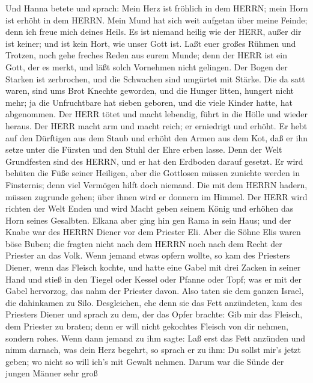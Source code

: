 Und Hanna betete und sprach: Mein Herz ist fröhlich in dem
HERRN; mein Horn ist erhöht in dem HERRN. Mein Mund hat sich weit
aufgetan über meine Feinde; denn ich freue mich deines Heils.
 Es ist niemand heilig wie der HERR, außer dir ist keiner;
und ist kein Hort, wie unser Gott ist.  Laßt euer großes
Rühmen und Trotzen, noch gehe freches Reden aus eurem Munde; denn der
HERR ist ein Gott, der es merkt, und läßt solch Vornehmen nicht
gelingen.  Der Bogen der Starken ist zerbrochen, und die
Schwachen sind umgürtet mit Stärke.  Die da satt waren, sind
ums Brot Knechte geworden, und die Hunger litten, hungert nicht mehr; ja
die Unfruchtbare hat sieben geboren, und die viele Kinder hatte, hat
abgenommen.  Der HERR tötet und macht lebendig, führt in die
Hölle und wieder heraus.  Der HERR macht arm und macht
reich; er erniedrigt und erhöht.  Er hebt auf den Dürftigen
aus dem Staub und erhöht den Armen aus dem Kot, daß er ihn setze unter
die Fürsten und den Stuhl der Ehre erben lasse. Denn der Welt
Grundfesten sind des HERRN, und er hat den Erdboden darauf gesetzt.
 Er wird behüten die Füße seiner Heiligen, aber die
Gottlosen müssen zunichte werden in Finsternis; denn viel Vermögen hilft
doch niemand.  Die mit dem HERRN hadern, müssen zugrunde
gehen; über ihnen wird er donnern im Himmel. Der HERR wird richten der
Welt Enden und wird Macht geben seinem König und erhöhen das Horn seines
Gesalbten.  Elkana aber ging hin gen Rama in sein Haus; und
der Knabe war des HERRN Diener vor dem Priester Eli.  Aber
die Söhne Elis waren böse Buben; die fragten nicht nach dem HERRN
 noch nach dem Recht der Priester an das Volk. Wenn jemand
etwas opfern wollte, so kam des Priesters Diener, wenn das Fleisch
kochte, und hatte eine Gabel mit drei Zacken in seiner Hand
 und stieß in den Tiegel oder Kessel oder Pfanne oder Topf;
was er mit der Gabel hervorzog, das nahm der Priester davon. Also taten
sie dem ganzen Israel, die dahinkamen zu Silo. 
Desgleichen, ehe denn sie das Fett anzündeten, kam des Priesters Diener
und sprach zu dem, der das Opfer brachte: Gib mir das Fleisch, dem
Priester zu braten; denn er will nicht gekochtes Fleisch von dir nehmen,
sondern rohes.  Wenn dann jemand zu ihm sagte: Laß erst das
Fett anzünden und nimm darnach, was dein Herz begehrt, so sprach er zu
ihm: Du sollst mir's jetzt geben; wo nicht so will ich's mit Gewalt
nehmen.  Darum war die Sünde der jungen Männer sehr groß
